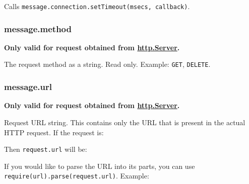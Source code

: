 Calls \texttt{message.connection.setTimeout(msecs,\ callback)}.

\subsubsection{message.method}\label{message.method}

\textbf{Only valid for request obtained from
\hyperref[httpux5fclassux5fhttpux5fserver]{http.Server}.}

The request method as a string. Read only. Example:
\texttt{\textquotesingle{}GET\textquotesingle{}},
\texttt{\textquotesingle{}DELETE\textquotesingle{}}.

\subsubsection{message.url}\label{message.url}

\textbf{Only valid for request obtained from
\hyperref[httpux5fclassux5fhttpux5fserver]{http.Server}.}

Request URL string. This contains only the URL that is present in the
actual HTTP request. If the request is:

\begin{Shaded}
\begin{Highlighting}[]
\end{Highlighting}
\end{Shaded}

Then \texttt{request.url} will be:

\begin{Shaded}
\begin{Highlighting}[]
\end{Highlighting}
\end{Shaded}

If you would like to parse the URL into its parts, you can use
\texttt{require(\textquotesingle{}url\textquotesingle{}).parse(request.url)}.
Example:

\begin{Shaded}
\begin{Highlighting}[]
\NormalTok{(}\NormalTok{(}\NormalTok{)}
\NormalTok{\{ }\NormalTok{: }\NormalTok{,}
  \NormalTok{: }\NormalTok{,}
  \NormalTok{: }\NormalTok{,}
  \NormalTok{: } \NormalTok{\}}
\end{Highlighting}
\end{Shaded}

